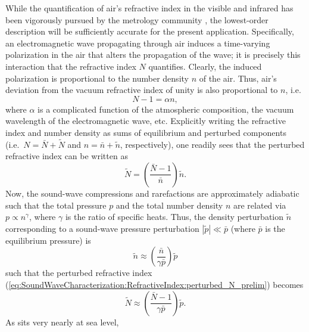 While the quantification of air's refractive index
in the visible and infrared
has been vigorously pursued by the metrology community
\cite{young_refractivity_of_air, stone_index_of_refraction_of_air,
marchetti_ipt06, mathar_N_IR_07},
the lowest-order description will be sufficiently accurate
for the present application.
Specifically, an electromagnetic wave propagating through air
induces a time-varying polarization in the air
that alters the propagation of the wave;
it is precisely this interaction
that the refractive index $N$ quantifies.
Clearly, the induced polarization is
proportional to the number density $n$ of the air.
Thus, air's deviation from the vacuum refractive index of unity
is also proportional to $n$, i.e.\
\begin{equation}
  N - 1 = \alpha n,
  \label{eq:SoundWaveCharacterization:RefractiveIndex:deviation_from_vacuum}
\end{equation}
where $\alpha$ is a complicated function of
the atmospheric composition,
the vacuum wavelength of the electromagnetic wave, etc.
Explicitly writing the refractive index and number density
as sums of equilibrium and perturbed components
(i.e.\ $N = \bar{N} + \tilde{N}$ and
$n = \bar{n} + \tilde{n}$, respectively),
one readily sees that the perturbed refractive index can be written as
\begin{equation}
  \tilde{N}
  =
  \left( \frac{\bar{N} - 1}{\bar{n}} \right)
  \tilde{n}
  \label{eq:SoundWaveCharacterization:RefractiveIndex:perturbed_N_prelim}.
\end{equation}
Now, the sound-wave compressions and rarefactions
are approximately adiabatic such that
the total pressure $p$ and the total number density $n$ are related via
$p \propto n^{\gamma}$, where $\gamma$ is the ratio of specific heats.
Thus, the density perturbation $\tilde{n}$
corresponding to a sound-wave pressure perturbation
$|\tilde{p}| \ll \bar{p}$ (where $\bar{p}$ is the equilibrium pressure) is
\begin{equation}
  \tilde{n}
  \approx
  \left( \frac{\bar{n}}{\gamma \bar{p}} \right)
  \tilde{p}
\end{equation}
such that the perturbed refractive index
(\ref{eq:SoundWaveCharacterization:RefractiveIndex:perturbed_N_prelim})
becomes
\begin{equation}
  \tilde{N}
  \approx
  \left( \frac{\bar{N} - 1}{\gamma \bar{p}} \right)
  \tilde{p}.
  \label{eq:SoundWaveCharacterization:RefractiveIndex:perturbed_N}
\end{equation}
As \diiid\space sits very nearly at sea level,
